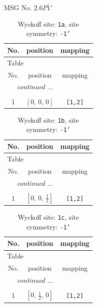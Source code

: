 \documentclass[fleqn,8pt]{jsarticle}
\begin{document}
\setcounter{MaxMatrixCols}{32}

\renewcommand{\tablename}{Table~}
\renewcommand{\figurename}{Figure~}
\begin{center}
\LARGE
MSG No. 2.6\quad$P\bar{1}'$
\end{center}
\renewcommand{\arraystretch}{1.2}
\begin{longtable}{ccc}
\caption{Wyckoff site: {\tt 1a}, site symmetry: {\tt -1'}}
 \\
 \hline \hline
No. & position & mapping \\ \hline \endfirsthead

\multicolumn{2}{l}{\tablename\ \thetable{}} \\
 \hline \hline
No. & position & mapping \\ \hline \endhead

 \hline \hline
\multicolumn{2}{r}{\footnotesize\it continued ...} \\ \endfoot

 \hline \hline
\multicolumn{2}{r}{} \\ \endlastfoot

1 & $\left[ 0,\, 0,\, 0 \right]$ & {\tt [1,2]} \\
\end{longtable}
\renewcommand{\arraystretch}{1.2}
\begin{longtable}{ccc}
\caption{Wyckoff site: {\tt 1b}, site symmetry: {\tt -1'}}
 \\
 \hline \hline
No. & position & mapping \\ \hline \endfirsthead

\multicolumn{2}{l}{\tablename\ \thetable{}} \\
 \hline \hline
No. & position & mapping \\ \hline \endhead

 \hline \hline
\multicolumn{2}{r}{\footnotesize\it continued ...} \\ \endfoot

 \hline \hline
\multicolumn{2}{r}{} \\ \endlastfoot

1 & $\left[ 0,\, 0,\, \frac{1}{2} \right]$ & {\tt [1,2]} \\
\end{longtable}
\renewcommand{\arraystretch}{1.2}
\begin{longtable}{ccc}
\caption{Wyckoff site: {\tt 1c}, site symmetry: {\tt -1'}}
 \\
 \hline \hline
No. & position & mapping \\ \hline \endfirsthead

\multicolumn{2}{l}{\tablename\ \thetable{}} \\
 \hline \hline
No. & position & mapping \\ \hline \endhead

 \hline \hline
\multicolumn{2}{r}{\footnotesize\it continued ...} \\ \endfoot

 \hline \hline
\multicolumn{2}{r}{} \\ \endlastfoot

1 & $\left[ 0,\, \frac{1}{2},\, 0 \right]$ & {\tt [1,2]} \\
\end{longtable}
\end{document}
